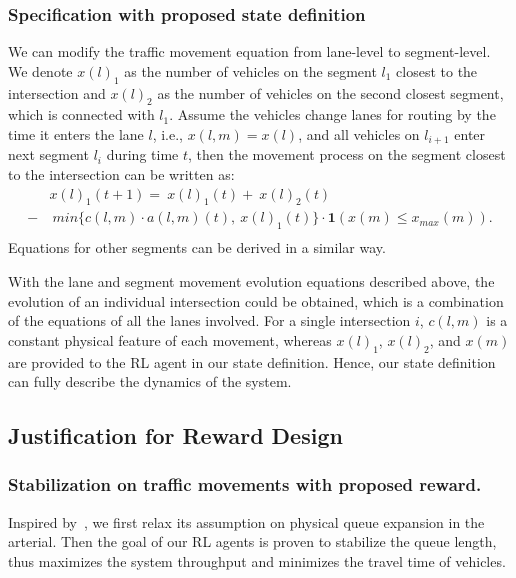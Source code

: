 \subsubsection{Specification with proposed state definition}
We can modify the traffic movement equation from lane-level to segment-level. We denote $x(l)_1$ as the number of vehicles on the segment $l_1$ closest to the intersection and $x(l)_2$ as the number of vehicles on the second closest segment, which is connected with $l_1$. Assume the vehicles change lanes for routing by the time it enters the lane $l$, i.e., $x(l,m)=x(l)$, and all vehicles on $l_{i+1}$ enter next segment $l_{i}$ during time $t$, then the movement process on the segment closest to the intersection can be written as:
\begin{equation}
\begin{split}
\label{eq:queue-process-segnment}
      & x(l)_1(t+1) = \ x(l)_1(t) + \ x(l)_2(t)\\
    - &\ min\{c(l,m)\cdot a(l,m)(t),\ x(l)_1(t)\}\cdot \mathbf{1}(x(m)\le x_{max}(m)). \\
\end{split}
\end{equation}
Equations for other segments can be derived in a similar way. 
 
With the lane and segment movement evolution equations described above, the evolution of an individual intersection could be obtained, which is a combination of the equations of all the lanes involved. For a single intersection $i$, $c(l,m)$ is a constant physical feature of each movement, whereas $x(l)_1$, $x(l)_2$, and $x(m)$ are provided to the RL agent in our state definition. Hence, our state definition can fully describe the dynamics of the system.


\subsection{Justification for Reward Design}
\subsubsection{Stabilization on traffic movements with proposed reward.}
Inspired by~\cite{MP13}, we first relax its assumption on physical queue expansion in the arterial. Then the goal of our RL agents is proven to stabilize the queue length, thus maximizes the system throughput and minimizes the travel time of vehicles.


